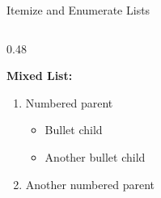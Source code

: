 \begin{frame}{Itemize and Enumerate Lists}
\begin{columns}[T]
\begin{column}{0.48\textwidth}
      \vspace{0.2cm}

      \textbf{Mixed List:}
      \begin{enumerate}
        \setlength{\itemsep}{0pt}
        \item Numbered parent
          \begin{itemize}
            \item Bullet child
            \item Another bullet child
          \end{itemize}
        \item Another numbered parent
      \end{enumerate}
    \end{column}
  \end{columns}
\end{frame}

